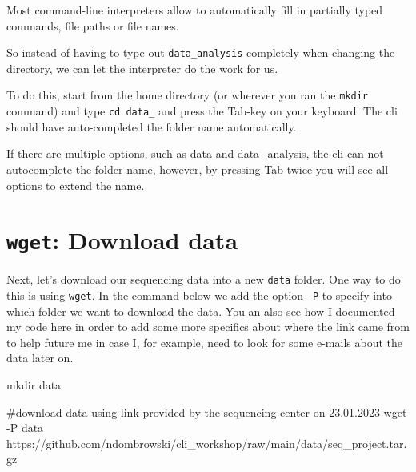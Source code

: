 \documentclass[
  letterpaper,
  DIV=11,
  numbers=noendperiod]{scrreprt}
\newenvironment{Shaded}{}{}
\newcommand{\AttributeTok}[1]{\textcolor[rgb]{0.84,0.23,0.29}{#1}}
\newcommand{\CommentTok}[1]{\textcolor[rgb]{0.42,0.45,0.49}{#1}}
\newcommand{\FunctionTok}[1]{\textcolor[rgb]{0.44,0.26,0.76}{#1}}
\newcommand{\NormalTok}[1]{\textcolor[rgb]{0.14,0.16,0.18}{#1}}
\begin{document}
\begin{tcolorbox}[enhanced jigsaw, bottomtitle=1mm, colframe=quarto-callout-tip-color-frame, left=2mm, leftrule=.75mm, coltitle=black, colbacktitle=quarto-callout-tip-color!10!white, toprule=.15mm, rightrule=.15mm, opacityback=0, titlerule=0mm, colback=white, breakable, bottomrule=.15mm, title=\textcolor{quarto-callout-tip-color}{\faLightbulb}\hspace{0.5em}{Tip: Command-line completion}, arc=.35mm, toptitle=1mm, opacitybacktitle=0.6]

Most command-line interpreters allow to automatically fill in partially
typed commands, file paths or file names.

So instead of having to type out \texttt{data\_analysis} completely when
changing the directory, we can let the interpreter do the work for us.

To do this, start from the home directory (or wherever you ran the
\texttt{mkdir} command) and type \texttt{cd\ data\_} and press the
Tab-key on your keyboard. The cli should have auto-completed the folder
name automatically.

If there are multiple options, such as data and data\_analysis, the cli
can not autocomplete the folder name, however, by pressing Tab twice you
will see all options to extend the name.

\end{tcolorbox}

\section{\texorpdfstring{\texttt{wget}: Download
data}{wget: Download data}}\label{wget-download-data}

Next, let's download our sequencing data into a new \texttt{data}
folder. One way to do this is using \texttt{wget}. In the command below
we add the option \texttt{-P} to specify into which folder we want to
download the data. You an also see how I documented my code here in
order to add some more specifics about where the link came from to help
future me in case I, for example, need to look for some e-mails about
the data later on.

\begin{Shaded}
\begin{Highlighting}[]
\FunctionTok{mkdir}\NormalTok{ data}

\CommentTok{\#download data using link provided by the sequencing center on 23.01.2023}
\FunctionTok{wget} \AttributeTok{{-}P}\NormalTok{ data https://github.com/ndombrowski/cli\_workshop/raw/main/data/seq\_project.tar.gz}
\end{Highlighting}
\end{Shaded}
\end{document}
